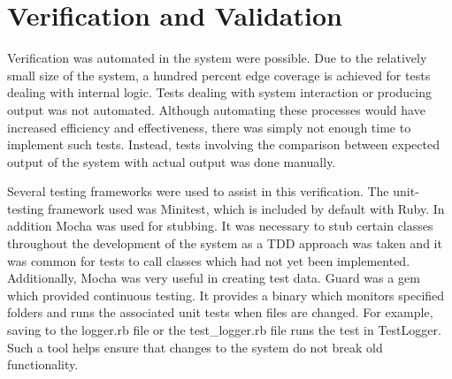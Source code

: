 \chapter{Verification and Validation}
\label{chap:verification}
Verification was automated in the system were possible. Due to the relatively small size of the system, a hundred percent edge coverage is achieved for tests dealing with internal logic. Tests dealing with system interaction or producing output was not automated. Although automating these processes would have increased efficiency and effectiveness, there was simply not enough time to implement such tests. Instead, tests involving the comparison between expected output of the system with actual output was done manually.

Several testing frameworks were used to assist in this verification. The unit-testing framework used was Minitest, which is included by default with Ruby. In addition Mocha was used for stubbing. It was necessary to stub certain classes throughout the development of the system as a TDD approach was taken and it was common for tests to call classes which had not yet been implemented. Additionally, Mocha was very useful in creating test data. Guard was a gem which provided continuous testing. It provides a binary which monitors specified folders and runs the associated unit tests when files are changed. For example, saving to the logger.rb file or the test\_logger.rb file runs the test in TestLogger. Such a tool helps ensure that changes to the system do not break old functionality.
